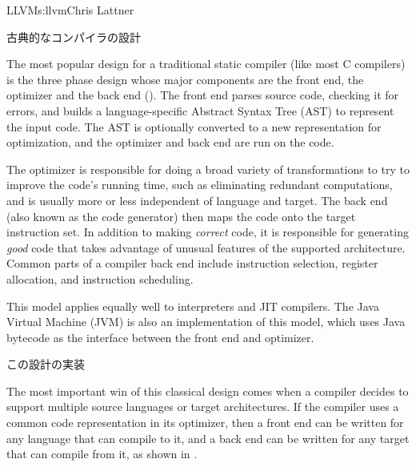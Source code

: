 \begin{aosachapter}{LLVM}{s:llvm}{Chris Lattner}
\begin{aosasect1}{古典的なコンパイラの設計}

The most popular design for a traditional static compiler (like most C
compilers) is the three phase design whose major components are the
front end, the optimizer and the back end
(). The front end parses source code, checking
it for errors, and builds a language-specific Abstract Syntax Tree
(AST) to represent the input code.  The AST is optionally converted to
a new representation for optimization, and the optimizer and back end
are run on the code.


The optimizer is responsible for doing a broad variety of
transformations to try to improve the code's running time, such as
eliminating redundant computations, and is usually more or less
independent of language and target.  The back end (also known as the
code generator) then maps the code onto the target instruction set.
In addition to making \emph{correct} code, it is responsible for
generating \emph{good} code that takes advantage of unusual features
of the supported architecture.  Common parts of a compiler back end
include instruction selection, register allocation, and instruction
scheduling.

This model applies equally well to interpreters and JIT compilers.
The Java Virtual Machine (JVM) is also an implementation of this
model, which uses Java bytecode as the interface between the front end
and optimizer.

\begin{aosasect2}{この設計の実装}

The most important win of this classical design comes when a compiler
decides to support multiple source languages or target
architectures. If the compiler uses a common code representation in
its optimizer, then a front end can be written for any language that
can compile to it, and a back end can be written for any target that
can compile from it, as shown in .



\end{aosasect2}
\end{aosasect1}
\end{aosachapter}
